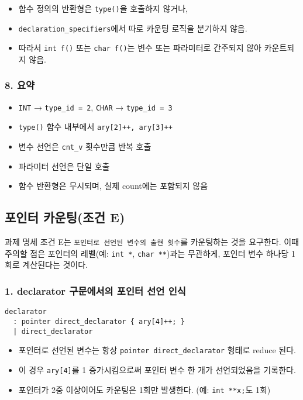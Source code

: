 \documentclass{article}
\begin{document}
\begin{itemize}
  \item 함수 정의의 반환형은 \texttt{type()}을 호출하지 않거나,
  \item \texttt{declaration\_specifiers}에서 따로 카운팅 로직을 분기하지 않음.
  \item 따라서 \texttt{int f()} 또는 \texttt{char f()}는 변수 또는 파라미터로 간주되지 않아 카운트되지 않음.
\end{itemize}

\subsubsection*{8. 요약}

\begin{itemize}
  \item \texttt{INT} → \texttt{type\_id = 2}, \texttt{CHAR} → \texttt{type\_id = 3}
  \item \texttt{type()} 함수 내부에서 \texttt{ary[2]++, ary[3]++}
  \item 변수 선언은 \texttt{cnt\_v} 횟수만큼 반복 호출
  \item 파라미터 선언은 단일 호출
  \item 함수 반환형은 무시되며, 실제 count에는 포함되지 않음
\end{itemize}


\subsection{포인터 카운팅(조건 E)}

과제 명세 조건 E는 \texttt{포인터로 선언된 변수의 출현 횟수}를 카운팅하는 것을 요구한다. 이때 주의할 점은 포인터의 레벨(예: \texttt{int *}, \texttt{char **})과는 무관하게, 포인터 변수 하나당 1회로 계산된다는 것이다.


\subsubsection*{1. declarator 구문에서의 포인터 선언 인식}
\begin{lstlisting}
declarator
  : pointer direct_declarator { ary[4]++; }
  | direct_declarator
\end{lstlisting}

\begin{itemize}
  \item 포인터로 선언된 변수는 항상 \texttt{pointer direct\_declarator} 형태로 reduce 된다.
  \item 이 경우 \texttt{ary[4]}를 1 증가시킴으로써 포인터 변수 한 개가 선언되었음을 기록한다.
  \item 포인터가 2중 이상이어도 카운팅은 1회만 발생한다. (예: \texttt{int **x;}도 1회)
\end{itemize}
\end{document}
